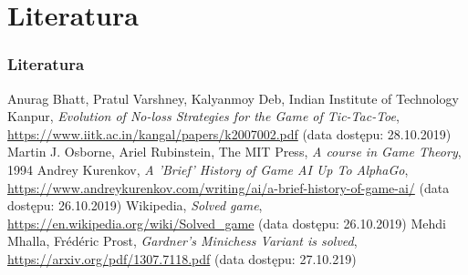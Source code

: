 \documentclass[polish,envcountsect,10pt]{beamer}
\begin{document}
    \section{Literatura}
        \begin{frame}
            \frametitle{Literatura}
            \begin{thebibliography}{9}
                Anurag Bhatt, Pratul Varshney, Kalyanmoy Deb, Indian Institute of Technology Kanpur, \emph{Evolution of No-loss Strategies for the Game of Tic-Tac-Toe}, \url{https://www.iitk.ac.in/kangal/papers/k2007002.pdf} (data dostępu: 28.10.2019)
                Martin J. Osborne, Ariel Rubinstein, The MIT Press, \emph{A course in Game Theory}, 1994
                Andrey Kurenkov, \emph{A 'Brief' History of Game AI Up To AlphaGo}, \url{https://www.andreykurenkov.com/writing/ai/a-brief-history-of-game-ai/} (data dostępu: 26.10.2019)
                Wikipedia, \emph{Solved game}, \url{https://en.wikipedia.org/wiki/Solved_game} (data dostępu: 26.10.2019)
                Mehdi Mhalla, Fr\'ed\'eric Prost, \emph{Gardner’s Minichess Variant is solved}, \url{https://arxiv.org/pdf/1307.7118.pdf} (data dostępu: 27.10.219)
            \end{thebibliography}
        \end{frame}
\end{document}
